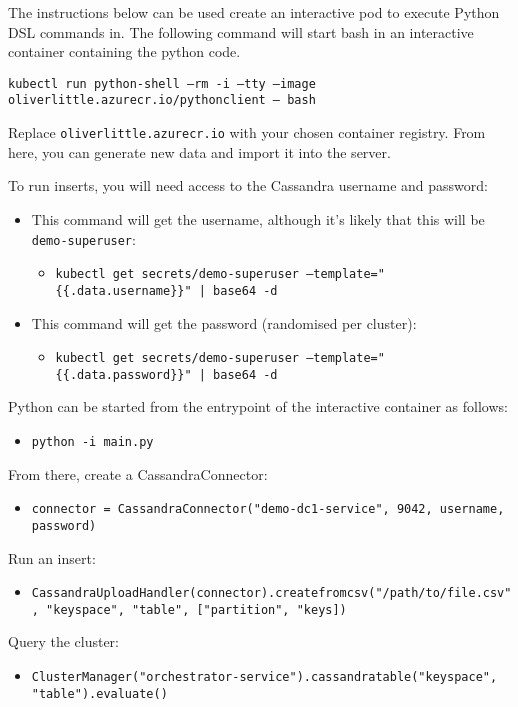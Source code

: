 The instructions below can be used create an interactive pod to execute Python DSL commands in. The following command will start bash in an interactive container containing the python code.

\texttt{kubectl run python-shell --rm -i --tty --image oliverlittle.azurecr.io/python\textunderscore client -- bash}

Replace \texttt{oliverlittle.azurecr.io} with your chosen container registry. From here, you can generate new data and import it into the server.

To run inserts, you will need access to the Cassandra username and password:
\begin{itemize}
	\item This command will get the username, although it's likely that this will be \texttt{demo-superuser}:
	\begin{itemize}
		\item \texttt{kubectl get secrets/demo-superuser --template="\{\{.data.username\}\}" | base64 -d}
	\end{itemize}
	\item This command will get the password (randomised per cluster):
	\begin{itemize}
		\item \texttt{kubectl get secrets/demo-superuser --template="\{\{.data.password\}\}" | base64 -d}
	\end{itemize}
\end{itemize}

Python can be started from the entrypoint of the interactive container as follows:
\begin{itemize}
	\item \texttt{python -i main.py}
\end{itemize}

From there, create a CassandraConnector:
\begin{itemize}
	\item \texttt{connector = CassandraConnector("demo-dc1-service", 9042, {username}, {password})}
\end{itemize}

Run an insert:
\begin{itemize}
	\item \texttt{CassandraUploadHandler(connector).create\textunderscore from\textunderscore csv("/path/to/file.csv", "keyspace", "table", ["partition", "keys])}
\end{itemize}

Query the cluster:
\begin{itemize}
	\item \texttt{ClusterManager("orchestrator-service").cassandra\textunderscore table("keyspace", "table").evaluate()}
\end{itemize}

